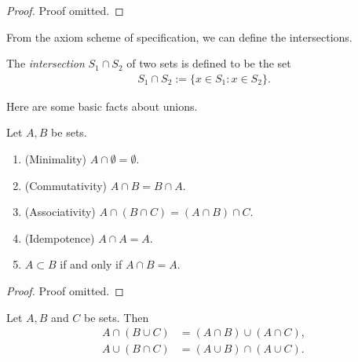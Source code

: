 \begin{proof}
Proof omitted.
\end{proof}

From the axiom scheme of specification, we can define the intersections.
\begin{definition}[Intersections]
    The \emph{intersection} $S_1 \cap S_2$ of two sets is defined to be the set
    \begin{align*}
        S_1 \cap S_2 := \{x \in S_1 : x \in S_2\}.
    \end{align*}
\end{definition}

Here are some basic facts about unions.

\begin{proposition}
    Let $A, B$ be sets.
    \begin{enumerate}
        \item (Minimality) $A \cap \emptyset = \emptyset$.
        \item (Commutativity) $A \cap B = B \cap A$.
        \item (Associativity) $A \cap (B \cap C) = (A \cap B) \cap C$.
        \item (Idempotence) $A \cap A = A$.
        \item $A \subset B$ if and only if $A \cap B = A$.
    \end{enumerate}
\end{proposition}

\begin{proof}
    Proof omitted.
\end{proof}

\begin{proposition}
    Let $A, B$ and $C$ be sets. Then
        \begin{align*}
            A \cap (B \cup C) &= (A \cap B) \cup (A \cap C),\\
            A \cup (B \cap C) &= (A \cup B) \cap (A \cup C).
        \end{align*}
\end{proposition}

